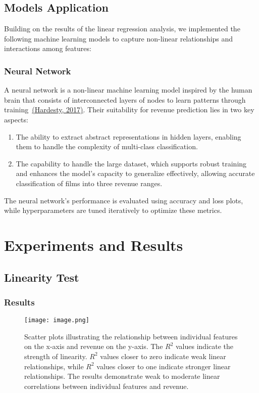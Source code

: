 \documentclass{article}
\begin{document}
\subsection{Models Application}
Building on the results of the linear regression analysis, we implemented the following machine learning models to capture non-linear relationships and interactions among features:

\subsubsection{Neural Network}
A neural network is a non-linear machine learning model inspired by the human brain that consists of interconnected layers of nodes to learn patterns through training~\hyperref[Hardesty2017]{(Hardesty, 2017)}. Their suitability for revenue prediction lies in two key aspects: 
\begin{enumerate}
    \item The ability to extract abstract representations in hidden layers, enabling them to handle the complexity of multi-class classification.
    \item The capability to handle the large dataset, which supports robust training and enhances the model's capacity to generalize effectively, allowing accurate classification of films into three revenue ranges.
\end{enumerate}
The neural network's performance is evaluated using accuracy and loss plots, while hyperparameters are tuned iteratively to optimize these metrics.

\section{Experiments and Results}
\label{results}
\subsection{Linearity Test}
\subsubsection{Results}

\begin{figure}[H] 
    \centering
    \vspace{0.3cm} 
    \texttt{[image: image.png]} %
    \caption{Scatter plots illustrating the relationship between individual features on the x-axis and revenue on the y-axis. The \( R^2 \) values indicate the strength of linearity. \( R^2 \) values closer to zero indicate weak linear relationships, while \( R^2 \) values closer to one indicate stronger linear relationships. The results demonstrate weak to moderate linear correlations between individual features and revenue.}
    \label{fig:scatter_plots}
\end{figure}
\end{document}
